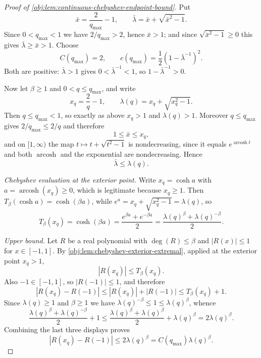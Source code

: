 \begin{proof}[Proof of \cref{obj:lem:continuous-chebyshev-endpoint-bound}]
Put
\[
\bar{x}=\frac{2}{q_{\max}}-1,
\qquad
\bar{\lambda}=\bar{x}+\sqrt{\bar{x}^2-1}.
\]
Since \(0<q_{\max}<1\) we have \(2/q_{\max}>2\), hence \(\bar{x}>1\); and since \(\sqrt{\bar{x}^2-1}\ge0\) this gives \(\bar{\lambda}\ge \bar{x}>1\). Choose
\[
C(q_{\max})=2,
\qquad
c(q_{\max})=\frac12(1-\bar{\lambda}^{-1})^2 .
\]
Both are positive: \(\bar{\lambda}>1\) gives \(0<\bar{\lambda}^{-1}<1\), so \(1-\bar{\lambda}^{-1}>0\). %

Now let \(\beta\ge1\) and \(0<q\le q_{\max}\), and write
\[
x_q=\frac2q-1,
\qquad
\lambda(q)=x_q+\sqrt{x_q^2-1}.
\]
Then \(q\le q_{\max}<1\), so exactly as above \(x_q>1\) and \(\lambda(q)>1\). Moreover \(q\le q_{\max}\) gives \(2/q_{\max}\le 2/q\) and therefore
\[
1\le \bar{x}\le x_q ,
\]
and on \([1,\infty)\) the map \(t\mapsto t+\sqrt{t^2-1}\) is nondecreasing, since it equals \(e^{\operatorname{arcosh} t}\) and both \(\operatorname{arcosh}\) and the exponential are nondecreasing. Hence
\[
\bar{\lambda}\le \lambda(q).
\] %

\emph{Chebyshev evaluation at the exterior point.}
Write \(x_q=\operatorname{cosh}a\) with \(a=\operatorname{arcosh}(x_q)\ge0\), which is legitimate because \(x_q\ge1\). Then \(T_\beta(\operatorname{cosh}a)=\operatorname{cosh}(\beta a)\), while \(e^{a}=x_q+\sqrt{x_q^2-1}=\lambda(q)\), so
\[
T_\beta(x_q)
=
\operatorname{cosh}(\beta a)
=
\frac{e^{\beta a}+e^{-\beta a}}{2}
=
\frac{\lambda(q)^\beta+\lambda(q)^{-\beta}}2 .
\] %

\emph{Upper bound.}
Let \(R\) be a real polynomial with \(\deg(R)\le\beta\) and \(|R(x)|\le1\) for \(x\in[-1,1]\). By \cref{obj:lem:chebyshev-exterior-extremal}, applied at the exterior point \(x_q>1\),
\[
|R(x_q)|\le T_\beta(x_q).
\] %
Also \(-1\in[-1,1]\), so \(|R(-1)|\le1\), and therefore
\[
|R(x_q)-R(-1)|
\le |R(x_q)|+|R(-1)|
\le T_\beta(x_q)+1.
\] %
Since \(\lambda(q)\ge1\) and \(\beta\ge1\) we have \(\lambda(q)^{-\beta}\le1\le\lambda(q)^{\beta}\), whence
\[
\frac{\lambda(q)^\beta+\lambda(q)^{-\beta}}2+1
\le
\frac{\lambda(q)^\beta+\lambda(q)^{\beta}}2+\lambda(q)^\beta
=
2\lambda(q)^\beta.
\] %
Combining the last three displays proves
\[
|R(x_q)-R(-1)|\le 2\lambda(q)^\beta
= C(q_{\max})\lambda(q)^\beta.
\]


\end{proof}
